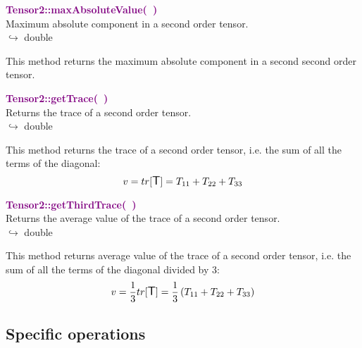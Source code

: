\textcolor{purple}{\textbf{Tensor2::maxAbsoluteValue(~)}}\label{Tensor2::maxAbsoluteValue()}\\
Maximum absolute component in a second order tensor.\\ \hspace*{10mm}$\hookrightarrow$ double

This method returns the maximum absolute component in a second second order tensor.

\textcolor{purple}{\textbf{Tensor2::getTrace(~)}}\label{Tensor2::getTrace()}\\
Returns the trace of a second order tensor.\\ \hspace*{10mm}$\hookrightarrow$ double

  This method returns the trace of a second order tensor, i.e. the sum of all the terms of the diagonal:
\begin{equation*}
v = tr[\mbox{\large\ensuremath{\mathsf{T}}}] = T_{11}+T_{22}+T_{33}
\end{equation*}

\textcolor{purple}{\textbf{Tensor2::getThirdTrace(~)}}\label{Tensor2::getThirdTrace()}\\
Returns the average value of the trace of a second order tensor.\\ \hspace*{10mm}$\hookrightarrow$ double

This method returns average value of the trace of a second order tensor, i.e. the sum of all the terms of the diagonal divided by 3:
\begin{equation*}
v = \frac{1}{3} tr[\mbox{\large\ensuremath{\mathsf{T}}}] =  \frac{1}{3} \left( T_{11}+T_{22}+T_{33} \right)
\end{equation*}

\subsection{Specific operations}

